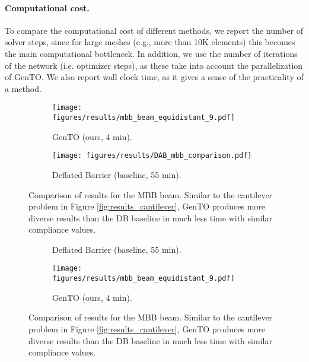 \paragraph{Computational cost.}
To compare the computational cost of different methods, 
we report the number of solver steps, since for large meshes (e.g., more than 10K elements) this becomes the main computational bottleneck.
In addition, we use the number of iterations of the network (i.e. optimizer steps), as these take into account the parallelization of GenTO.
We also report wall clock time, as it gives a sense of the practicality of a method.



    \begin{figure}[ht!]
        \centering
        \begin{subfigure}{\columnwidth}
            \centering
            \texttt{[image: figures/results/mbb\_beam\_equidistant\_9.pdf]}
            \caption{GenTO (ours, 4 min).}
            \label{fig:results_2d_mbb_beam}
        \end{subfigure}
        \hfill %
        \begin{subfigure}{\columnwidth}
            \centering
            \texttt{[image: figures/results/DAB\_mbb\_comparison.pdf]}
            \caption{Deflated Barrier (baseline, 55 min).}
            \label{fig:DB_mbb}
        \end{subfigure}
        \caption{Comparison of results for the MBB beam. Similar to the cantilever problem in Figure \ref{fig:results_cantilever}, GenTO produces more diverse results than the DB baseline in much less time with similar compliance values.}
        \label{fig:results_mbb_beam}
    \end{figure}

\else

    \begin{figure}[ht!]
        \centering
        \begin{subfigure}{0.48\textwidth}
            \centering
            \caption{Deflated Barrier (baseline, 55 min).}
            \label{fig:DB_mbb}
        \end{subfigure}
        \hfill %
        \begin{subfigure}{0.48\textwidth}
            \centering
            \texttt{[image: figures/results/mbb\_beam\_equidistant\_9.pdf]}
            \caption{GenTO (ours, 4 min).}
            \label{fig:results_2d_mbb_beam}
        \end{subfigure}
        \caption{Comparison of results for the MBB beam. Similar to the cantilever problem in Figure \ref{fig:results_cantilever}, GenTO produces more diverse results than the DB baseline in much less time with similar compliance values.}
        \label{fig:results_mbb_beam}
    \end{figure}


